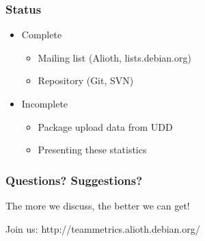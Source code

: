 \documentclass[compress]{beamer}
\begin{document}
\begin{frame}
    \frametitle{Status}
    \begin{itemize}
        \item Complete
        \begin{itemize}
            \item Mailing list (Alioth, lists.debian.org)
            \item Repository (Git, SVN)
        \end{itemize}
    \end{itemize}

    \begin{itemize}
        \item Incomplete
        \begin{itemize}
            \item Package upload data from UDD
            \item Presenting these statistics
        \end{itemize}
    \end{itemize}
\end{frame}

\begin{frame}
    \frametitle{Questions? Suggestions?}
    \begin{center}
    The more we discuss, the better we can get!
    \end{center}
    \begin{center}
    Join us: http://teammetrics.alioth.debian.org/
    \end{center}
\end{frame}
\end{document}

